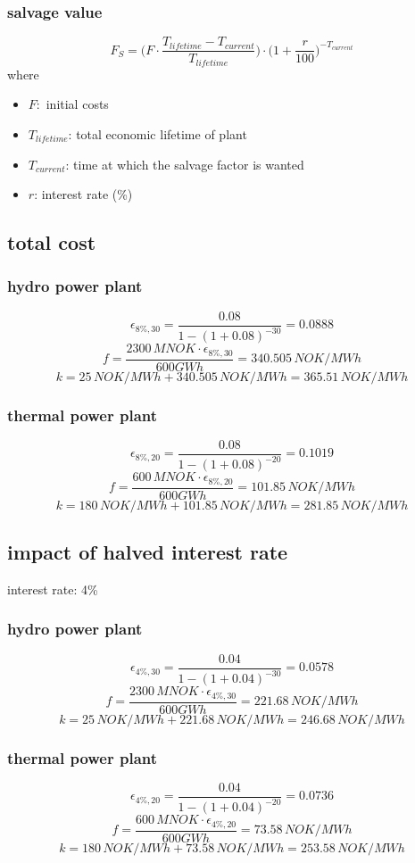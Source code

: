\documentclass{article}
\begin{document}
\subsubsection{salvage value}
\begin{equation}
F_S=\bigg(F\cdot\frac{T_{lifetime}-T_{current}}{T_{lifetime}}\bigg)\cdot\bigg(1+\frac{r}{100}\bigg)^{-T_{current}}
\end{equation}
where
\begin{itemize}
\item $F:$ initial costs
\item $T_{lifetime}$: total economic lifetime of plant
\item $T_{current}$: time at which the salvage factor is wanted
\item $r$: interest rate (\%)
\end{itemize}
\subsection{total cost}
\subsubsection{hydro power plant}
$$\epsilon_{8\%,30}=\frac{0.08}{1-(1+0.08)^{-30}}=0.0888$$
$$f=\frac{2300\,MNOK\cdot\epsilon_{8\%,30}}{600GWh}=340.505\,NOK/MWh$$
$$k=25\,NOK/MWh+340.505\,NOK/MWh=365.51\,NOK/MWh$$
\subsubsection{thermal power plant}
$$\epsilon_{8\%,20}=\frac{0.08}{1-(1+0.08)^{-20}}=0.1019$$
$$f=\frac{600\,MNOK\cdot\epsilon_{8\%,20}}{600GWh}=101.85\,NOK/MWh$$
$$k=180\,NOK/MWh+101.85\,NOK/MWh=281.85\,NOK/MWh$$
\subsection{impact of halved interest rate}
interest rate: 4\%
\subsubsection{hydro power plant}
$$\epsilon_{4\%,30}=\frac{0.04}{1-(1+0.04)^{-30}}=0.0578$$
$$f=\frac{2300\,MNOK\cdot\epsilon_{4\%,30}}{600GWh}=221.68\,NOK/MWh$$
$$k=25\,NOK/MWh+221.68\,NOK/MWh=246.68\,NOK/MWh$$
\subsubsection{thermal power plant}
$$\epsilon_{4\%,20}=\frac{0.04}{1-(1+0.04)^{-20}}=0.0736$$
$$f=\frac{600\,MNOK\cdot\epsilon_{4\%,20}}{600GWh}=73.58\,NOK/MWh$$
$$k=180\,NOK/MWh+73.58\,NOK/MWh=253.58\,NOK/MWh$$
\end{document}
